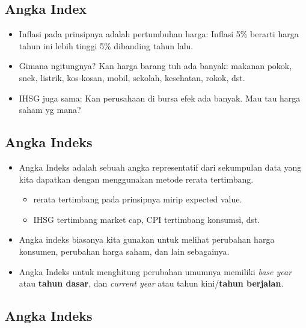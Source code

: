 \documentclass[
  letterpaper,
  DIV=11,
  numbers=noendperiod]{scrartcl}
\begin{document}
\hypertarget{angka-index}{%
\subsection{Angka Index}\label{angka-index}}

\begin{itemize}
\item
  Inflasi pada prinsipnya adalah pertumbuhan harga: Inflasi 5\% berarti
  harga tahun ini lebih tinggi 5\% dibanding tahun lalu.
\item
  Gimana ngitungnya? Kan harga barang tuh ada banyak: makanan pokok,
  snek, listrik, kos-kosan, mobil, sekolah, kesehatan, rokok, dst.
\item
  IHSG juga sama: Kan perusahaan di bursa efek ada banyak. Mau tau harga
  saham yg mana?
\end{itemize}

\hypertarget{angka-indeks}{%
\subsection{Angka Indeks}\label{angka-indeks}}

\begin{itemize}
\item
  Angka Indeks adalah sebuah angka representatif dari sekumpulan data
  yang kita dapatkan dengan menggunakan metode rerata tertimbang.

  \begin{itemize}
  \item
    rerata tertimbang pada prinsipnya mirip expected value.
  \item
    IHSG tertimbang market cap, CPI tertimbang konsumsi, dst.
  \end{itemize}
\item
  Angka indeks biasanya kita gunakan untuk melihat perubahan harga
  konsumen, perubahan harga saham, dan lain sebagainya.
\item
  Angka Indeks untuk menghitung perubahan umumnya memiliki \emph{base
  year} atau \textbf{tahun dasar}, dan \emph{current year} atau tahun
  kini/\textbf{tahun berjalan}.
\end{itemize}

\hypertarget{angka-indeks-1}{%
\subsection{Angka Indeks}\label{angka-indeks-1}}
\end{document}
